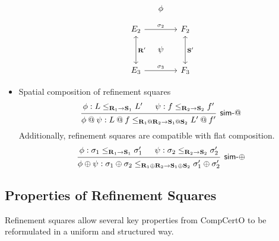 \begin{theorem}
\begin{itemize}
\[\begin{tikzcd}[sep=small]
          & \phi &\\
          E_2 \ar[rr, "\sigma_2"] \ar[dd, leftrightarrow, "\mathbf{R'}"] &&
          F_2 \ar[dd, leftrightarrow, "\mathbf{S'}"] \\
          & \psi & \\
          E_3 \ar[rr, "\sigma_3"] && F_3
        \end{tikzcd}
      \]
    \item Spatial composition of refinement squares
      \[
        \begin{prooftree}
          \hypo{\phi: L \le_{\mathbf{R}_1 \rightarrow \mathbf{S}_1} L'}
          \hypo{\psi: f \le_{\mathbf{R}_2 \rightarrow \mathbf{S}_2} f'}
          \infer2[\kw{sim}-$\mathbin@$]{\phi \mathbin@ \psi :
            L \mathbin@ f
            \le_{\mathbf{R}_1 \mathbin@ \mathbf{R}_2 \rightarrow
            \mathbf{S}_1 \mathbin@ \mathbf{S}_2}
          L' \mathbin@ f'}
        \end{prooftree}
      \]
      Additionally,
      refinement squares are compatible with flat composition.
      \[
        \begin{prooftree}
          \hypo{\phi: \sigma_1 \le_{\mathbf{R}_1 \rightarrow \mathbf{S}_1} \sigma_1'}
          \hypo{\psi: \sigma_2 \le_{\mathbf{R}_2 \rightarrow \mathbf{S}_2} \sigma_2'}
          \infer2[\kw{sim}-$\oplus$]{\phi \oplus \psi :
            \sigma_1 \oplus \sigma_2
            \le_{\mathbf{R}_1 \oplus \mathbf{R}_2 \rightarrow
            \mathbf{S}_1 \oplus \mathbf{S}_2}
          \sigma_1' \oplus \sigma_2'}
        \end{prooftree}
      \]
  \end{itemize}
\end{theorem}

\subsection{Properties of Refinement Squares}

Refinement squares
allow several key properties
from CompCertO
to be reformulated in a uniform and structured way.

